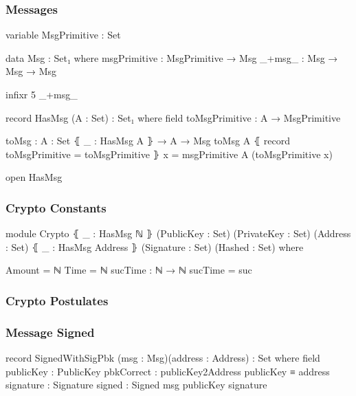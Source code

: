 \documentclass{beamer}
\begin{document}
\begin{frame}
  \frametitle{Messages}
\begin{code}

variable
  MsgPrimitive : Set

data Msg : Set₁ where
  msgPrimitive : MsgPrimitive → Msg
  _+msg_ : Msg → Msg → Msg

infixr 5 _+msg_

record HasMsg (A : Set) : Set₁ where
  field
    toMsgPrimitive : A → MsgPrimitive

toMsg : {A : Set} ⦃ _ : HasMsg A ⦄ → A → Msg
toMsg {A} ⦃ record { toMsgPrimitive = toMsgPrimitive } ⦄ x
  = msgPrimitive {A} (toMsgPrimitive x)

open HasMsg

\end{code}
\end{frame}

\begin{frame}
  \frametitle{Crypto Constants}
\begin{code}

module Crypto
  ⦃ _ : HasMsg ℕ ⦄
  (PublicKey : Set)
  (PrivateKey : Set)
  (Address : Set)
  ⦃ _ : HasMsg Address ⦄
  (Signature : Set)
  (Hashed : Set)
  where

  Amount = ℕ
  Time = ℕ
  sucTime : ℕ → ℕ
  sucTime = suc

\end{code}
\end{frame}

\begin{frame}
  \frametitle{Crypto Postulates}
\end{frame}

\begin{frame}
  \frametitle{Message Signed}
\begin{code}
    record SignedWithSigPbk (msg : Msg)(address : Address)
      : Set where
      field
        publicKey   :  PublicKey
        pbkCorrect  :  publicKey2Address publicKey ≡ address
        signature   :  Signature
        signed      :  Signed msg publicKey signature

\end{code}
\end{frame}
\end{document}
